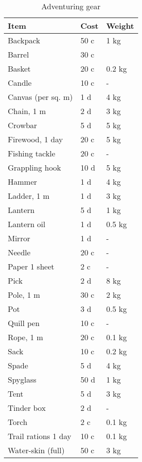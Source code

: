 \documentclass[a4paper,11pt,oneside]{book}
\begin{document}
\begin{table}[ht]
	\centering
	\caption{Adventuring gear}
	\begin{tabular}{|l|l|l|}
		\hline
		Item & Cost & Weight\\ [0.5ex]
		\hline
		Backpack & 50 c & 1 kg\\
		Barrel & 30 c & \\
		Basket & 20 c & 0.2 kg\\
		Candle & 10 c & -\\
		Canvas (per sq. m) & 1 d & 4 kg\\
		Chain, 1 m & 2 d & 3 kg\\
		Crowbar & 5 d & 5 kg\\
		Firewood, 1 day & 20 c & 5 kg\\
		Fishing tackle & 20 c & -\\
		Grappling hook & 10 d & 5 kg\\
		Hammer & 1 d & 4 kg\\
		Ladder, 1 m & 1 d & 3 kg\\
		Lantern & 5 d & 1 kg\\
		Lantern oil & 1 d & 0.5 kg \\
		Mirror & 1 d & -\\
		Needle & 20 c & -\\
		Paper 1 sheet & 2 c & -\\
		Pick & 2 d & 8 kg\\
		Pole, 1 m & 30 c & 2 kg\\
		Pot & 3 d & 0.5 kg\\
		Quill pen & 10 c & -\\
		Rope, 1 m & 20 c & 0.1 kg\\
		Sack & 10 c & 0.2 kg\\
		Spade & 5 d & 4 kg\\
		Spyglass & 50 d & 1 kg\\
		Tent & 5 d & 3 kg\\
		Tinder box & 2 d & -\\
		Torch & 2 c & 0.1 kg\\
		Trail rations 1 day & 10 c & 0.1 kg\\
		Water-skin (full) & 50 c & 3 kg\\		
		\hline
	\end{tabular}
\end{table}
\end{document}

